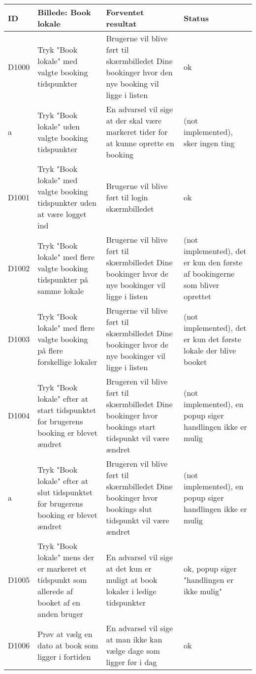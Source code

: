 \begin{tabularx}{\textwidth}{ |X|X|X|X| }
\hline
	ID & Billede: Book lokale  & Forventet resultat & Status\\ 
\hline
	D1000 & Tryk "Book lokale" med valgte booking tidspunkter & Brugerne vil blive ført til skærmbilledet Dine bookinger hvor den nye booking vil ligge i listen & ok\\
\hline
	a & Tryk "Book lokale" uden valgte booking tidspunkter & En advarsel vil sige at der skal være markeret tider for at kunne oprette en booking &(not implemented), sker ingen ting \\
\hline
D1001 & Tryk "Book lokale" med valgte booking tidspunkter uden at være logget ind & Brugerne vil blive ført til login skærmbilledet  & ok \\
\hline
	D1002 & Tryk "Book lokale" med flere valgte booking tidspunkter på samme lokale &  Brugerne vil blive ført til skærmbilledet Dine bookinger hvor de nye bookinger vil ligge i listen & (not implemented), det er kun den første af bookingerne som bliver oprettet\\
\hline
	D1003 & Tryk "Book lokale" med flere valgte booking på flere forskellige lokaler&  Brugerne vil blive ført til skærmbilledet Dine bookinger hvor de nye bookinger vil ligge i listen &(not implemented), det er kun det første lokale der blive booket \\
\hline
	D1004 & Tryk "Book lokale" efter at start tidspunktet for brugerens booking er blevet ændret & Brugeren vil blive ført til skærmbilledet Dine bookinger hvor bookings start tidspunkt vil være ændret &(not implemented), en popup siger handlingen ikke er mulig \\
\hline
	a & Tryk "Book lokale" efter at slut tidspunktet for brugerens booking er blevet ændret & Brugeren vil blive ført til skærmbilledet Dine bookinger hvor bookings slut tidspunkt vil være ændret &(not implemented), en popup siger handlingen ikke er mulig \\
\hline
	D1005 & Tryk "Book lokale" mens der er markeret et tidspunkt som allerede af booket af en anden bruger & En advarsel vil sige at det kun er muligt at book lokaler i ledige tidspunkter & ok, popup siger "handlingen er ikke mulig" \\
\hline
	D1006 & Prøv at vælg en dato at book som ligger i fortiden & En advarsel vil sige at man ikke kan vælge dage som ligger før i dag & ok \\
\end{tabularx}

